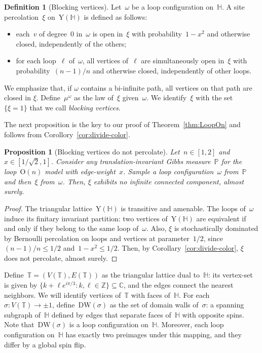 \documentclass[11pt,letterpaper]{amsart}
\newcounter{n}
\numberwithin{n}{section}
\theoremstyle{plain}
\newtheorem{proposition}[n]{Proposition}
\theoremstyle{definition}
\newtheorem{definition}[n]{Definition}
\theoremstyle{remark}
\renewcommand\O[1]{\(\mathrm{O}(#1)\)}
\newcommand\T{\mathbb T}
\renewcommand\P{\mathbb P}
\newcommand\Z{\mathbb Z}
\newcommand\hexlattice{{\mathbb H}}
\newcommand\vertices[1]{{V(#1)}}
\newcommand\edges[1]{{E(#1)}}
\newcommand\upvert{\mathrm{Y}} %
\newcommand{\1}{\mathbbm{1}}
\renewcommand\subset\subseteq
\begin{document}
\begin{definition}[Blocking vertices]\label{def:xi}
	Let~$\omega$ be a loop configuration on~$\hexlattice$.
	A site percolation~$\xi$ on~$\upvert(\hexlattice)$ is defined as follows: 
	\begin{itemize}
		\item each~$v$ of degree~$0$ in~$\omega$ is open in~$\xi$ with probability~$1-x^2$ and otherwise closed, independently of the others;
		\item for each loop~$\ell$ of~$\omega$, all vertices of~$\ell$ are simultaneously open in~$\xi$  with probability~$(n-1)/n$ and otherwise closed, independently of other loops.
	\end{itemize}
We emphasize that, if $\omega$ contains a bi-infinite path, all vertices on that path are closed in $\xi$. Define~$\mu^\omega$ as the law of~$\xi$ given~$\omega$.
	We identify~$\xi$ with the set~$\{\xi=1\}$ that we call {\em blocking vertices}.  
\end{definition}

The next proposition is the key to our proof of Theorem~\ref{thm:LoopOn} and follows from Corollory~\ref{cor:divide-color}.

\begin{proposition}[Blocking vertices do not percolate]
\label{prop:no-perc-xi}
	Let~$n\in [1,2]$ and~$x\in [1/\sqrt{2},1]$.
	Consider any translation-invariant Gibbs measure~$\P$ for the loop~\O{n} model with edge-weight~$x$.
	Sample a loop configuration~$\omega$ from~$\P$ and then~$\xi$ from~$\omega$.
	Then, $\xi$ exhibits no infinite connected component, almost surely.
\end{proposition}

\begin{proof}
	The triangular lattice~$\upvert(\hexlattice)$ is transitive and amenable.
	The loops of~$\omega$ induce its finitary invariant partition: two vertices of~$\upvert(\hexlattice)$ are equivalent if and only if they belong to the same loop of~$\omega$.
	Also, $\xi$ is stochastically dominated by Bernoulli percolation on loops and vertices at parameter~$1/2$, since~$(n-1)/n\leq 1/2$ and~$1-x^2\leq 1/2$.
	Then, by Corollary~\ref{cor:divide-color}, $\xi$ does not percolate, almost surely.
\end{proof}

Define~$\T=(\vertices\T, \edges\T)$ as the triangular lattice dual to~$\hexlattice$: its vertex-set is given by $\{k+\ell
e^{i\pi/3}:k,\ell\in\Z\}\subset\mathbb C$, and the edges connect the nearest neighbors.
We will identify vertices of~$\T$ with faces of~$\hexlattice$.
For each~$\sigma \colon \vertices\T \to \pm 1$, define~$\mathrm{DW}(\sigma)$ as the set of domain walls of~$\sigma$: 
a spanning subgraph of~$\hexlattice$ defined by edges that separate faces of~$\hexlattice$ with opposite spins.
Note that~$\mathrm{DW}(\sigma)$ is a loop configuration on~$\hexlattice$.
Moreover, each loop configuration on~$\hexlattice$ has exactly two preimages under this mapping, and they differ by a global spin flip.
 
\end{document}
